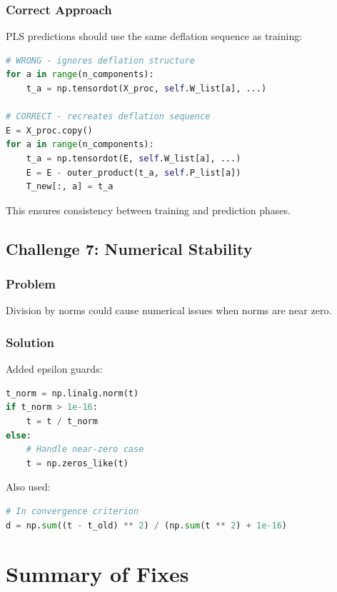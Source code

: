 \documentclass[12pt,a4paper]{article}
\begin{document}
\subsubsection{Correct Approach}
PLS predictions should use the same deflation sequence as training:

\begin{lstlisting}[language=Python]
# WRONG - ignores deflation structure
for a in range(n_components):
    t_a = np.tensordot(X_proc, self.W_list[a], ...)

# CORRECT - recreates deflation sequence
E = X_proc.copy()
for a in range(n_components):
    t_a = np.tensordot(E, self.W_list[a], ...)
    E = E - outer_product(t_a, self.P_list[a])
    T_new[:, a] = t_a
\end{lstlisting}

This ensures consistency between training and prediction phases.

\subsection{Challenge 7: Numerical Stability}

\subsubsection{Problem}
Division by norms could cause numerical issues when norms are near zero.

\subsubsection{Solution}
Added epsilon guards:

\begin{lstlisting}[language=Python]
t_norm = np.linalg.norm(t)
if t_norm > 1e-16:
    t = t / t_norm
else:
    # Handle near-zero case
    t = np.zeros_like(t)
\end{lstlisting}

Also used:
\begin{lstlisting}[language=Python]
# In convergence criterion
d = np.sum((t - t_old) ** 2) / (np.sum(t ** 2) + 1e-16)
\end{lstlisting}

\section{Summary of Fixes}
\end{document}
